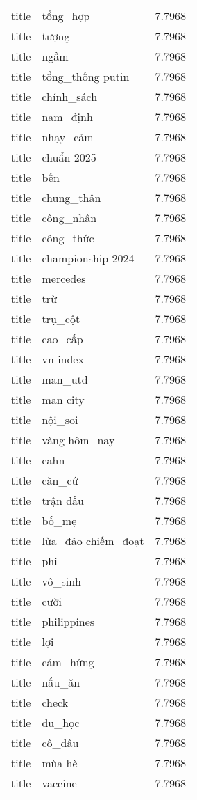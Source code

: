 \documentclass{article}
\begin{document}
\begin{tabular}{lll}
title & tổng\_hợp & 7.7968\\
title & tượng & 7.7968\\
title & ngầm & 7.7968\\
title & tổng\_thống putin & 7.7968\\
title & chính\_sách & 7.7968\\
title & nam\_định & 7.7968\\
title & nhạy\_cảm & 7.7968\\
title & chuẩn 2025 & 7.7968\\
title & bến & 7.7968\\
title & chung\_thân & 7.7968\\
title & công\_nhân & 7.7968\\
title & công\_thức & 7.7968\\
title & championship 2024 & 7.7968\\
title & mercedes & 7.7968\\
title & trừ & 7.7968\\
title & trụ\_cột & 7.7968\\
title & cao\_cấp & 7.7968\\
title & vn index & 7.7968\\
title & man\_utd & 7.7968\\
title & man city & 7.7968\\
title & nội\_soi & 7.7968\\
title & vàng hôm\_nay & 7.7968\\
title & cahn & 7.7968\\
title & căn\_cứ & 7.7968\\
title & trận đấu & 7.7968\\
title & bố\_mẹ & 7.7968\\
title & lừa\_đảo chiếm\_đoạt & 7.7968\\
title & phi & 7.7968\\
title & vô\_sinh & 7.7968\\
title & cười & 7.7968\\
title & philippines & 7.7968\\
title & lợi & 7.7968\\
title & cảm\_hứng & 7.7968\\
title & nấu\_ăn & 7.7968\\
title & check & 7.7968\\
title & du\_học & 7.7968\\
title & cô\_dâu & 7.7968\\
title & mùa hè & 7.7968\\
title & vaccine & 7.7968\\

\end{tabular}
\end{document}
